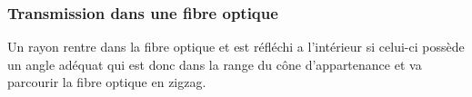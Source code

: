 			\subsubsection{Transmission dans une fibre optique}
				Un rayon rentre dans la fibre optique et est réfléchi a l'intérieur si celui-ci possède un angle adéquat qui est donc dans la range du cône d'appartenance et va parcourir la fibre optique en zigzag.
				